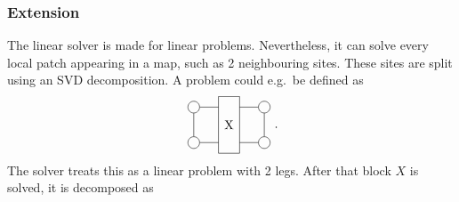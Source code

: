 \subsubsection{Extension}
The linear solver is made for linear problems. Nevertheless, it can solve every local patch appearing in a map, such as 2 neighbouring sites. These sites are split using an \Gls{SVD} decomposition.  A problem could e.g.\ be defined as
\begin{equation}
  \vcenter{\hbox{  \begin{tikzpicture}[baseline=0.5]

        \def \legLength { 0.8}
        \def \radius {0.1}

        \pgfmathsetmacro{\step}{2*\radius+ \legLength} %
        \pgfmathsetmacro{\legpos}{\radius+\legLength} %

        \node[draw, circle,radius=\radius] (L0) at (-1,0) {};
        \node[draw, circle,radius=\radius] (L1) at (-1,1) {};

        \draw (-0.3,1.3) -- (0.3,1.3) -- (0.3,-0.3) -- (-0.3,-0.3) -- cycle;

        \node[draw, circle,radius=\radius] (R0) at (1,0) {};
        \node[draw, circle,radius=\radius] (R1) at (1,1) {};

        \draw (L0) --   (L1);
        \draw (R0) --   (R1);

        \draw (L0) --   (-0.3,0);
        \draw (L1) --   (-0.3,1);

        \draw (R0) --   (0.3,0);
        \draw (R1) --   (0.3,1);

        \node[draw=none] (C0) at (0,0.5) {X};
      \end{tikzpicture} }} .
\end{equation}
The solver treats this as a linear problem with 2 legs. After that block $X$ is solved, it is decomposed as
